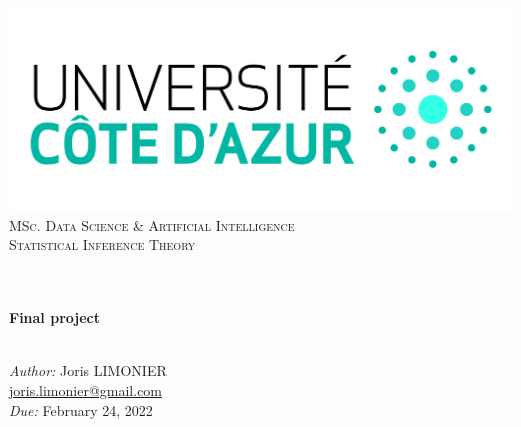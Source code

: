 \begin{titlepage}
	\begin{center}
		\includegraphics[width=\textwidth]{images/logo_uca.jpeg}\\[0.1cm]
		\vspace{1.5cm}
		\textsc{\Large MSc. Data Science \& Artificial Intelligence}\\[1.2cm]
		\textsc{\Large Statistical Inference Theory}\\[1.2cm]
		\\
		\vspace{1cm}

		\HRule \\[0.6cm]
		{\huge \bfseries Final project}\\[0.3cm]
		\HRule \\[1.8cm]
		\vfill

		\large
		\emph{Author:} Joris LIMONIER\\[.2cm]
		\href{mailto:joris.limonier@gmail.com}{\color{black}joris.limonier@gmail.com} \\[.2cm]
		\emph{Due:} {\large February 24, 2022}
	\end{center}
\end{titlepage}


